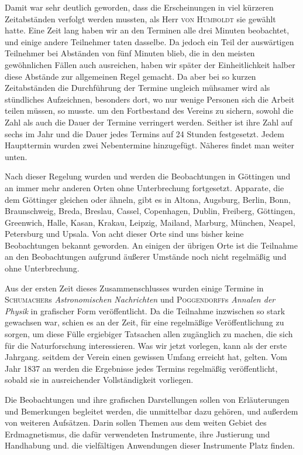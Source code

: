 Damit war sehr deutlich geworden, dass die Erscheinungen in viel kürzeren Zeitabständen verfolgt werden mussten, als Herr \textsc{von Humboldt} sie gewählt hatte. Eine Zeit lang haben wir an den Terminen alle drei Minuten beobachtet, und einige andere Teilnehmer taten dasselbe. Da jedoch ein Teil der auswärtigen Teilnehmer bei Abständen von fünf Minuten blieb, die in den meisten gewöhnlichen Fällen auch ausreichen, haben wir später der Einheitlichkeit halber diese Abstände zur allgemeinen Regel gemacht. Da aber bei so kurzen Zeitabständen die
Durchführung der Termine ungleich mühsamer wird als stündliches Aufzeichnen, besonders dort, wo nur wenige Personen sich die Arbeit teilen müssen, so musste. um den Fortbestand des Vereins zu sichern, sowohl die Zahl als auch die Dauer der Termine verringert werden. Seither ist ihre Zahl auf sechs im Jahr und die Dauer jedes Termins auf 24 Stunden festgesetzt. Jedem Haupttermin wurden zwei Nebentermine hinzugefügt. Näheres findet man weiter unten.

Nach dieser Regelung wurden und werden die Beobachtungen in Göttingen und an immer mehr anderen Orten ohne Unterbrechung fortgesetzt. Apparate, die dem Göttinger gleichen oder ähneln, gibt es in Altona, Augsburg, Berlin, Bonn, Braunschweig, Breda, Breslau, Cassel, Copenhagen, Dublin, Freiberg, Göttingen, Greenwich, Halle, Kasan, Krakau, Leipzig, Mailand, Marburg, München, Neapel, Petersburg und Upsala. Von acht dieser Orte sind uns bisher keine Beobachtungen bekannt geworden. An einigen der übrigen Orte ist die Teilnahme an den Beobachtungen aufgrund äußerer Umstände noch nicht regelmäßig und ohne Unterbrechung.

Aus der ersten Zeit dieses Zusammenschlusses wurden einige Termine in \textsc{Schumacher}s \textit{Astronomischen Nachrichten} und \textsc{Poggendorff}s \textit{Annalen der Physik} in grafischer Form veröffentlicht. Da die Teilnahme inzwischen so stark gewachsen war, schien es an der Zeit, für eine regelmäßige Veröffentlichung zu sorgen, um diese Fülle ergiebiger Tatsachen allen zugänglich zu machen, die sich für die Naturforschung interessieren. Was wir jetzt vorlegen, kann als der erste Jahrgang. seitdem der Verein einen gewissen Umfang erreicht hat, gelten. Vom Jahr 1837 an werden die Ergebnisse jedes Termins regelmäßig veröffentlicht, sobald sie in ausreichender Vollständigkeit vorliegen.

Die Beobachtungen und ihre grafischen Darstellungen sollen von Erläuterungen und Bemerkungen begleitet werden, die unmittelbar dazu gehören, und außerdem von weiteren Aufsätzen. Darin sollen Themen aus dem weiten Gebiet des Erdmagnetismus, die dafür verwendeten Instrumente, ihre Justierung und Handhabung und. die vielfältigen Anwendungen dieser Instrumente Platz finden.

